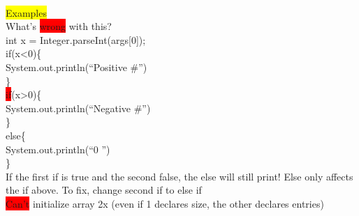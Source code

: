 ~\\ \color{Black}
\colorbox{yellow}{Examples}
\\ What's \colorbox{Red}{wrong} with this?
\\ int x = Integer.parseInt(args[0]);
\\ if(x<0)\{\
\\ \phantom{abc}System.out.println(\textquotedblleft Positive \#\textquotedblright)
\\ \}
\\ \colorbox{Red}{if}(x>0)\{\
\\ \phantom{abc}System.out.println(\textquotedblleft Negative \#\textquotedblright)
\\ \}
\\ else\{
\\ \phantom{abc}System.out.println(\textquotedblleft 0 \textquotedblright)
\\\}
\\ If the first if is true and the second false, the else will still print! Else only affects the if above. To fix, change second if to else if
\\ \colorbox{Red}{Can't} initialize array 2x (even if 1 declares size, the other declares entries)